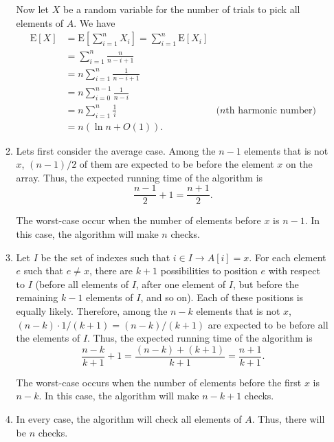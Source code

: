 \begin{enumerate}
\begin{framed}
\begin{enumerate}
Now let $X$ be a random variable for the number of trials to pick all elements
of $A$. We have
\begin{equation*}
\begin{aligned}
  \text{E}[X] &= \text{E}\left[\sum_{i = 1}^{n} X_i \right]
              = \sum_{i = 1}^{n} \text{E}[X_i]\\
              &= \sum_{i = 1}^{n} \frac{n}{n - i + 1}\\
              &= n \sum_{i = 1}^{n} \frac{1}{n - i + 1}\\
              &= n \sum_{i = 0}^{n - 1} \frac{1}{n - i}\\
              &= n \sum_{i = 1}^{n} \frac{1}{i} & \text{($n$th harmonic number)}\\
              &= n (\ln n + O(1)).
\end{aligned}
\end{equation*}

\item Lets first consider the average case. Among the $n - 1$ elements that is
not $x$, $(n - 1)/2$ of them are expected to be before the element $x$ on the
array. Thus, the expected running time of the algorithm is
\[
  \frac{n - 1}{2} + 1 = \frac{n + 1}{2}.
\]

The worst-case occur when the number of elements before $x$ is $n - 1$. In this
case, the algorithm will make $n$ checks.

\item Let $I$ be the set of indexes such that $i \in I \rightarrow A[i] = x$.
For each element $e$ such that $e \neq x$, there are $k + 1$ possibilities to
position $e$ with respect to $I$ (before all elements of $I$, after one
element of $I$, but before the remaining $k - 1$ elements of $I$, and so on).
Each of these positions is equally likely.  Therefore, among the $n - k$
elements that is not $x$, $(n - k) \cdot 1/(k + 1) = (n - k)/(k + 1)$ are
expected to be before all the elements of $I$. Thus, the expected running time
of the algorithm is
\[
  \frac{n - k}{k + 1} + 1 = \frac{(n - k) + (k + 1)}{k + 1} = \frac{n + 1}{k + 1}.
\]

The worst-case occurs when the number of elements before the first $x$ is
$n - k$. In this case, the algorithm will make $n - k + 1$ checks.

\item In every case, the algorithm will check all elements of $A$. Thus, there
will be $n$ checks.


\end{enumerate}
\end{framed}
\end{enumerate}
